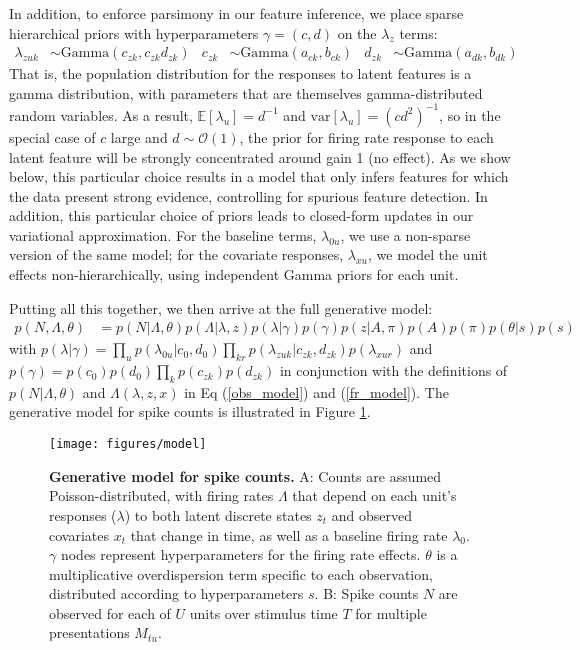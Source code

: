 \documentclass{nature}
\begin{document}
In addition, to enforce parsimony in our feature inference, we place sparse hierarchical priors with hyperparameters $\gamma = (c, d)$ on the $\lambda_z$ terms:
\begin{align}
    \label{hierarchy}
    \lambda_{zuk} &\sim \text{Gamma}(c_{zk}, c_{zk} d_{zk}) & c_{zk} &\sim \text{Gamma}(a_{ck}, b_{ck})
    & d_{zk} &\sim \text{Gamma}(a_{dk}, b_{dk})
\end{align}
That is, the population distribution for the responses to latent features is a gamma distribution, with parameters that are themselves gamma-distributed random variables. As a result, $\mathbb{E}[\lambda_u] = d^{-1}$ and $\text{var}[\lambda_u] = (cd^2)^{-1}$, so in the special case of $c$ large and $d\sim \mathcal{O}(1)$, the prior for firing rate response to each latent feature will be strongly concentrated around gain 1 (no effect). As we show below, this particular choice results in a model that only infers features for which the data present strong evidence, controlling for spurious feature detection. In addition, this particular choice of priors leads to closed-form updates in our variational approximation. For the baseline terms, $\lambda_{0u}$, we use a non-sparse version of the same model; for the covariate responses, $\lambda_{xu}$, we model the unit effects non-hierarchically, using independent Gamma priors for each unit.

Putting all this together, we then arrive at the full generative model:
\begin{align}
    p(N, \Lambda, \theta) &= p(N| \Lambda, \theta)p(\Lambda|\lambda, z)
    p(\lambda|\gamma) p(\gamma)
    p(z|A, \pi)
    p(A)p(\pi)p(\theta|s)p(s)
\end{align}
with $p(\lambda|\gamma) = \prod_u p(\lambda_{0u}|c_0, d_0)\prod_{kr} p(\lambda_{zuk}|c_{zk}, d_{zk}) p(\lambda_{xur})$ and $p(\gamma) = p(c_0)p(d_0)\prod_k p(c_{zk}) p(d_{zk})$ in conjunction with the definitions of $p(N|\Lambda, \theta)$ and $\Lambda(\lambda, z, x)$ in Eq (\ref{obs_model}) and (\ref{fr_model}). The generative model for spike counts is illustrated in Figure \ref{fig1}.

\begin{figure}
    \texttt{[image: figures/model]}
	\caption{\textbf{Generative model for spike counts.}
	A: Counts are assumed Poisson-distributed, with firing rates $\Lambda$ that depend on each unit's responses ($\lambda$) to both latent discrete states $z_t$ and observed covariates $x_t$ that change in time, as well as a baseline firing rate $\lambda_0$. $\gamma$ nodes represent hyperparameters for the firing rate effects. $\theta$ is a multiplicative overdispersion term specific to each observation, distributed according to hyperparameters $s$. B: Spike counts $N$ are observed for each of $U$ units over stimulus time $T$ for multiple presentations $M_{tu}$.}
\label{fig1}
\end{figure}
\end{document}
